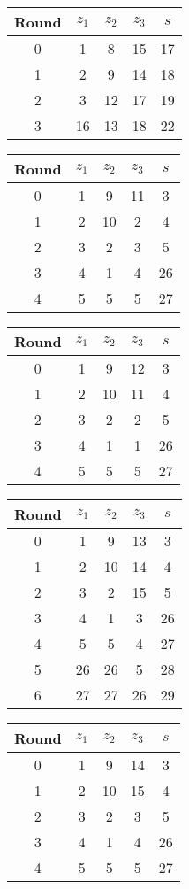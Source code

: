 \begin{multicols}{2}
\begin{tabular}{c | c | c | c | c }
Round & $z_1$ & $z_2$ & $z_3$ & $s$ \\
\hline
0 & 1 & 8 & 15 & 17 \\
1 & 2 & 9 & 14 & 18 \\
2 & 3 & 12 & 17 & 19 \\
3 & 16 & 13 & 18 & 22
\end{tabular}

\begin{tabular}{c | c | c | c | c }
Round & $z_1$ & $z_2$ & $z_3$ & $s$ \\
\hline
0 & 1 & 9 & 11 & 3 \\
1 & 2 & 10 & 2 & 4 \\
2 & 3 & 2 & 3 & 5 \\
3 & 4 & 1 & 4 & 26 \\
4 & 5 & 5 & 5 & 27
\end{tabular}


\begin{tabular}{c | c | c | c | c }
Round & $z_1$ & $z_2$ & $z_3$ & $s$ \\
\hline
0 & 1 & 9 & 12 & 3 \\
1 & 2 & 10 & 11 & 4 \\
2 & 3 & 2 & 2 & 5 \\
3 & 4 & 1 & 1 & 26 \\
4 & 5 & 5 & 5 & 27
\end{tabular}


\begin{tabular}{c | c | c | c | c }
Round & $z_1$ & $z_2$ & $z_3$ & $s$ \\
\hline
0 & 1 & 9 & 13 & 3 \\
1 & 2 & 10 & 14 & 4 \\
2 & 3 & 2 & 15 & 5 \\
3 & 4 & 1 & 3 & 26 \\
4 & 5 & 5 & 4 & 27 \\
5 & 26 & 26 & 5 & 28 \\
6 & 27 & 27 & 26 & 29
\end{tabular}


\begin{tabular}{c | c | c | c | c }
Round & $z_1$ & $z_2$ & $z_3$ & $s$ \\
\hline
0 & 1 & 9 & 14 & 3 \\
1 & 2 & 10 & 15 & 4 \\
2 & 3 & 2 & 3 & 5 \\
3 & 4 & 1 & 4 & 26 \\
4 & 5 & 5 & 5 & 27
\end{tabular}



\end{multicols}
